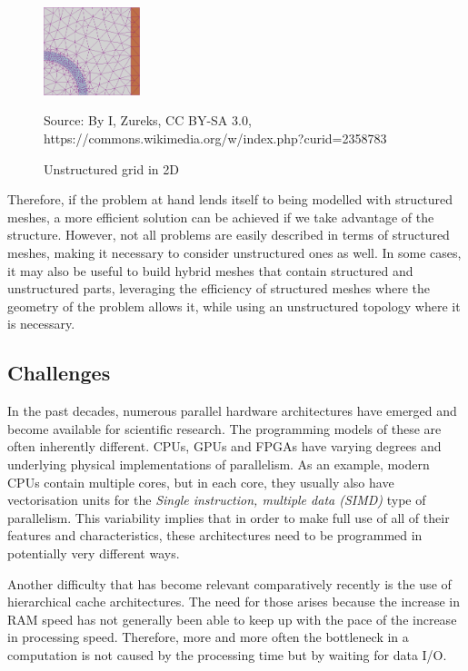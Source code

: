 \documentclass[fontsize=11pt, appendixprefix=true]{scrreprt}
\begin{document}
\begin{figure}
    \centering
    \includegraphics[width=0.25\textwidth]{unstructured_mesh}
    \caption{Unstructured grid in 2D}
    \label{fig:unstructured_mesh}

    \small Source: By I, Zureks, CC BY-SA 3.0, %
    https://commons.wikimedia.org/w/index.php?curid=2358783
\end{figure}

Therefore, if the problem at hand lends itself to being modelled with structured
meshes, a more efficient solution can be achieved if we take advantage of the
structure. However, not all problems are easily described in terms of structured
meshes, making it necessary to consider unstructured ones as well. In some
cases, it may also be useful to build hybrid meshes that contain structured and
unstructured parts, leveraging the efficiency of structured meshes where the
geometry of the problem allows it, while using an unstructured topology where it
is necessary.

\subsection{Challenges}
In the past decades, numerous parallel hardware architectures have emerged and
become available for scientific research. The programming models of these are
often inherently different. CPUs, GPUs and FPGAs have varying degrees and
underlying physical implementations of parallelism. As an example, modern CPUs
contain multiple cores, but in each core, they usually also have vectorisation
units for the \textit{Single instruction, multiple data (SIMD)} type of
parallelism. This variability implies that in order to make full use of all of
their features and characteristics, these architectures need to be programmed in
potentially very different ways.

Another difficulty that has become relevant comparatively recently is the use of
hierarchical cache architectures. The need for those arises because the increase
in RAM speed has not generally been able to keep up with the pace of the
increase in processing speed. Therefore, more and more often the bottleneck in a
computation is not caused by the processing time but by waiting for data I/O.
\end{document}
